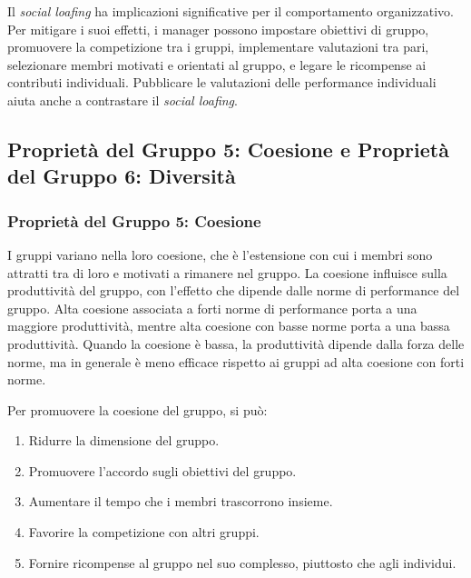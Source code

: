 \documentclass{article}
\begin{document}
Il \textit{social loafing} ha implicazioni significative per il comportamento organizzativo. Per mitigare i suoi effetti, i manager possono impostare obiettivi di gruppo, promuovere la competizione tra i gruppi, implementare valutazioni tra pari, selezionare membri motivati e orientati al gruppo, e legare le ricompense ai contributi individuali. Pubblicare le valutazioni delle performance individuali aiuta anche a contrastare il \textit{social loafing}.

\subsection{Proprietà del Gruppo 5: Coesione e Proprietà del Gruppo 6: Diversità}
\subsubsection{Proprietà del Gruppo 5: Coesione}
I gruppi variano nella loro coesione, che è l'estensione con cui i membri sono attratti tra di loro e motivati a rimanere nel gruppo. La coesione influisce sulla produttività del gruppo, con l'effetto che dipende dalle norme di performance del gruppo. Alta coesione associata a forti norme di performance porta a una maggiore produttività, mentre alta coesione con basse norme porta a una bassa produttività. Quando la coesione è bassa, la produttività dipende dalla forza delle norme, ma in generale è meno efficace rispetto ai gruppi ad alta coesione con forti norme.

Per promuovere la coesione del gruppo, si può:
\begin{enumerate}
    \item Ridurre la dimensione del gruppo.
    \item Promuovere l'accordo sugli obiettivi del gruppo.
    \item Aumentare il tempo che i membri trascorrono insieme.
    \item Favorire la competizione con altri gruppi.
    \item Fornire ricompense al gruppo nel suo complesso, piuttosto che agli individui.
\end{enumerate}
\end{document}
